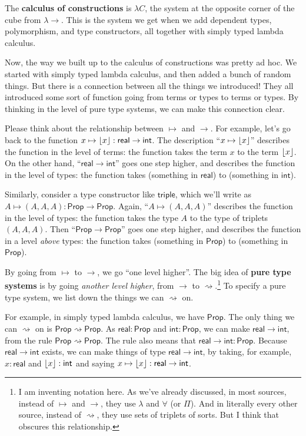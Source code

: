 \documentclass[11pt,paper=letter]{scrartcl}
\renewcommand{\sf}{\mathsf}
\newcommand{\prop}{\mathsf{Prop}}
\newcommand{\toto}{\rightsquigarrow}
\begin{document}
The \textbf{calculus of constructions} is $\lambda C$, the system at the opposite corner of the cube from $\lambda \to$. This is the system we get when we add dependent types, polymorphism, and type constructors, all together with simply typed lambda calculus.

Now, the way we built up to the calculus of constructions was pretty ad hoc. We started with simply typed lambda calculus, and then added a bunch of random things. But there is a connection between all the things we introduced! They all introduced some sort of function going from terms or types to terms or types. By thinking in the level of pure type systems, we can make this connection clear.

Please think about the relationship between $\mapsto$ and $\to$. For example, let's go back to the function $x \mapsto \floor{x} : \sf{real} \to \sf{int}$. The description ``$x \mapsto \left\lfloor x \right\rfloor$'' describes the function in the level of terms: the function takes the term $x$ to the term $\left\lfloor x \right\rfloor$. On the other hand, ``$\sf{real} \to \sf{int}$'' goes one step higher, and describes the function in the level of types: the function takes (something in $\sf{real}$) to (something in $\sf{int}$).

Similarly, consider a type constructor like $\sf{triple}$, which we'll write as $A \mapsto (A, A, A) : \prop \to \prop$. Again, ``$A \mapsto (A, A, A)$'' describes the function in the level of types: the function takes the type $A$ to the type of triplets $(A, A, A)$. Then ``$\prop \to \prop$'' goes one step higher, and describes the function in a level \emph{above} types: the function takes (something in $\prop$) to (something in $\prop$).

By going from $\mapsto$ to $\to$, we go ``one level higher''. The big idea of \textbf{pure type systems} is by going \emph{another level higher}, from $\to$ to $\toto$.\footnote{I am inventing notation here. As we've already discussed, in most sources, instead of $\mapsto$ and $\to$, they use $\lambda$ and $\forall$ (or $\Pi$). And in literally every other source, instead of $\toto$, they use sets of triplets of sorts. But I think that obscures this relationship.} To specify a pure type system, we list down the things we can $\toto$ on.

For example, in simply typed lambda calculus, we have $\prop$. The only thing we can $\toto$ on is $\prop \toto \prop$. As $\sf{real}: \prop$ and $\sf{int}: \prop$, we can make $\sf{real} \to \sf{int}$, from the rule $\prop \toto \prop$. The rule also means that $\sf{real} \to \sf{int}: \prop$. Because $\sf{real} \to \sf{int}$ exists, we can make things of type $\sf{real} \to \sf{int}$, by taking, for example, $x: \sf{real}$ and $\floor{x}: \sf{int}$ and saying $x \mapsto \floor{x} : \sf{real} \to \sf{int}$.
\end{document}
